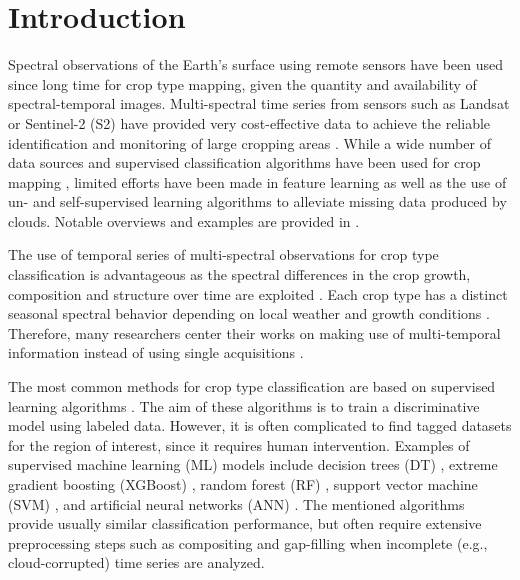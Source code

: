 \documentclass[journal,article,submit,pdftex,moreauthors]{Definitions/mdpi}
\begin{document}

\section{Introduction}
Spectral observations of the Earth's surface using remote sensors have been used since long time for crop type mapping, 
given the quantity and availability of spectral-temporal images. 
Multi-spectral time series from sensors such as Landsat or Sentinel-2 (S2) have provided very cost-effective data to achieve the reliable identification and monitoring of large cropping areas \cite{Vuolo2018, Pelletier2019, Foerster2012, Chen2022, Tariq2022, Gao2021}. 
While a wide number of data sources and supervised classification algorithms have been used for crop mapping \cite{Palchowdhuri2018,Heupel2018,Li2023,Dong2020,Paris2020,Russwurm2020,Nowakowski2021,Chen2022,Gadiraju2023, Wu2022}, limited efforts have been made in feature learning as well as the use of un- and self-supervised learning algorithms to alleviate missing data produced by clouds. Notable overviews and examples are provided in \cite{Yin2020,Yi2020,He2022, Dumeur2024, Wang2019}.

The use of temporal series of multi-spectral observations for crop type classification is advantageous as the spectral differences in the crop growth, composition and structure over time are exploited \cite{Vuolo2018,Yi2020, Gao2021, Maponya2020}.
Each crop type has a distinct seasonal spectral behavior depending on local weather and growth conditions \cite{Foerster2012,Gao2021,Russwurm2020}. 
Therefore, many researchers center their works on making use of multi-temporal information instead of
using single acquisitions \cite{Hu2016,Vuolo2018, Dong2020, Roy2020}.

The most common methods for crop type classification are based on supervised learning algorithms \cite{Kussul2017,Inglada2017,Cai2018,Feng2019,Zhong2019,Maponya2020,Russwurm2020,Prins2020,Chen2022,ManishLad2022, Agilandeeswari2022,Wu2022,Gadiraju2023,Tian2023}. 
The aim of these algorithms is to train a discriminative model using labeled data. However, it is often complicated to find tagged datasets for the region of interest, since it requires human intervention. Examples of supervised machine learning (ML) models include decision trees (DT) \cite{Rokach2005}, extreme gradient boosting (XGBoost) \cite{Chen2016}, random forest (RF) \cite{Breiman2001}, support vector machine (SVM) \cite{cortes1995}, and artificial neural networks (ANN) \cite{Rosenblatt1958}.
The mentioned algorithms provide usually similar classification performance, but often require extensive preprocessing steps such as compositing and gap-filling when incomplete (e.g., cloud-corrupted) time series are analyzed.
\end{document}
